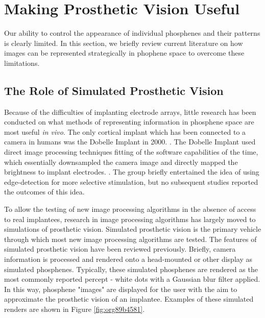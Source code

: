 \documentclass[a4paper,11pt,openany]{book}
\begin{document}
\clearpage

\chapter{Making Prosthetic Vision Useful}
\label{sec:orgdd8bf31}
\label{org1f456fd}

Our ability to control the appearance of individual phosphenes and their patterns is clearly limited.
In this section, we briefly review current literature on how images can be represented strategically in phophene space to overcome these limitations.

\section*{The Role of Simulated Prosthetic Vision}
\label{sec:orgca94eac}

Because of the difficulties of implanting electrode arrays, little research has been conducted on what methods of representing information in phosphene space are most useful \emph{in vivo}.
The only cortical implant which has been connected to a camera in humans was the Dobelle Implant in 2000. \cite{dobelle_artificial_2000}.
The Dobelle Implant used direct image processing techniques fitting of the software capabilities of the time, which essentially downsampled the camera image and directly mapped the brightness to implant electrodes. \cite{dobelle_artificial_2000}.
The group briefly entertained the idea of using edge-detection for more selective stimulation, but no subsequent studies reported the outcomes of this idea.

To allow the testing of new image processing algorithms in the absence of access to real implantees, research in image processing algorithms has largely moved to simulations of prosthetic vision. \cite{chen_simulating_2009-1,chen_simulating_2009}
Simulated prosthetic vision is the primary vehicle through which most new image processing algorithms are tested.
The features of simulated prosthetic vision have been reviewed previously. \cite{chen_simulating_2009-1}
Briefly, camera information is processed and rendered onto a head-mounted or other display as simulated phosphenes.
Typically, these simulated phosphenes are rendered as the most commonly reported percept - white dots with a Gaussian blur filter applied. \cite{chen_simulating_2009-1}
In this way, phosphene "images" are displayed for the user with the aim to approximate the prosthetic vision of an implantee.
Examples of these simulated renders are shown in Figure \ref{fig:org89b4581}.
\end{document}
